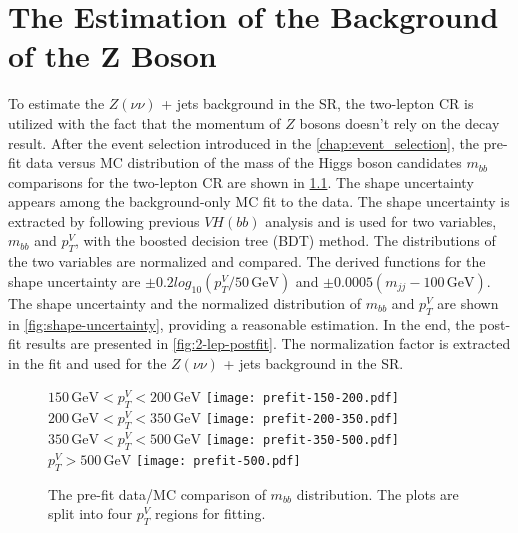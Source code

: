 \documentclass[class=NTHU_thesis, crop=false]{standalone}
\begin{document}
\chapter{The Estimation of the Background of the Z Boson}
\label{chap:Z_bkg_estimation}
To estimate the $Z(\nu\nu)$ + jets background in the SR, the two-lepton CR is utilized with the fact that the momentum of $Z$ bosons doesn't rely on the decay result. After the event selection introduced in the \autoref{chap:event_selection}, the pre-fit data versus MC distribution of the mass of the Higgs boson candidates $m_{bb}$ comparisons for the two-lepton CR are shown in \cref{fig:2-lep-prefit}. The shape uncertainty appears among the background-only MC fit to the data. The shape uncertainty is extracted by following previous $VH(bb)$ analysis\cite{Robson:2235887} and is used for two variables, $m_{bb}$ and $p^V_T$, with the boosted decision tree (BDT) method\cite{pmid28114007}. The distributions of the two variables are normalized and compared. The derived functions for the shape uncertainty are $\pm 0.2 log_{10} (p^V_T/50\, \mathrm{GeV})$ and $\pm 0.0005 (m_{jj} - 100\, \mathrm{GeV})$. The shape uncertainty and the normalized distribution of $m_{bb}$ and $p^V_T$ are shown in \cref{fig:shape-uncertainty}, providing a reasonable estimation. In the end, the post-fit results are presented in \cref{fig:2-lep-postfit}. The normalization factor is extracted in the fit and used for the $Z(\nu\nu)$ + jets background in the SR.

\begin{figure}[!hbt]
	\captionsetup[subfigure]{labelformat=empty}
	\centering
	\subcaptionbox
		{$150\, \mathrm{GeV} < p^V_T < 200\, \mathrm{GeV}$
		\label{fig:2-lep-prefit-fig1}}
		{\texttt{[image: prefit-150-200.pdf]}}
	~
	\subcaptionbox
		{$200\, \mathrm{GeV} < p^V_T < 350\, \mathrm{GeV}$
		\label{fig:2-lep-prefit-fig2}}
		{\texttt{[image: prefit-200-350.pdf]}}
	\vspace{\baselineskip}
	\subcaptionbox
		{$350\, \mathrm{GeV} < p^V_T < 500\, \mathrm{GeV}$
		\label{fig:2-lep-prefit-fig3}}
		{\texttt{[image: prefit-350-500.pdf]}}
	~
	\subcaptionbox
		{$p^V_T > 500\, \mathrm{GeV}$
		\label{fig:2-lep-prefit-fig4}}
		{\texttt{[image: prefit-500.pdf]}}
	\caption{The pre-fit data/MC comparison of $m_{bb}$ distribution. The plots are split into four $p^V_T$ regions for fitting.}
	\label{fig:2-lep-prefit}
\end{figure}
\end{document}
